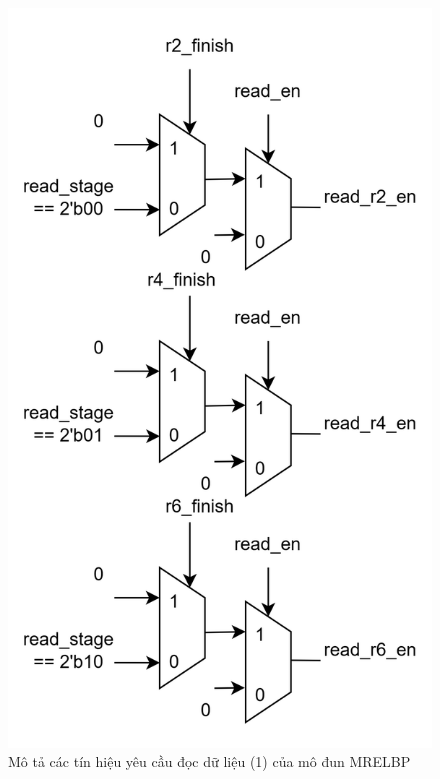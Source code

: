 \begin{figure}[!ht]
\begin{minipage}[t]{0.48\linewidth}
		\includegraphics[width=\linewidth]{figures/topRTL2.png} %
		\caption{Mô tả các tín hiệu yêu cầu đọc dữ liệu (1) của mô đun MRELBP} 
		\label{fig:topRTL2}
	\end{minipage}
\end{figure}
